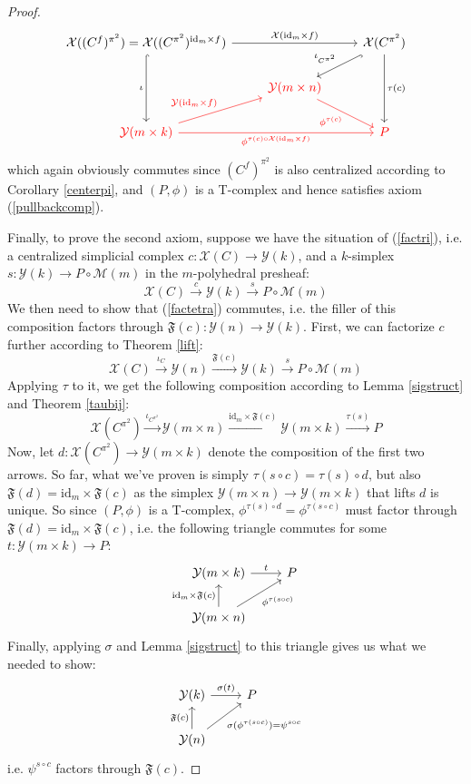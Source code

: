 \documentclass{article}
\theoremstyle{remark}
\theoremstyle{definition}
\newcommand{\id}{\mathrm{id}}
\newcommand{\Y}{\mathcal Y}
\newcommand{\X}{\mathcal X}
\newcommand{\F}{\mathfrak F}
\newcommand{\M}{\mathcal M}
\begin{document}
\begin{proof}
\[\begin{tikzcd}
			\X((C^f)^{\pi^2})=\X((C^{\pi^2})^{\id_m\times f})\arrow[hook]{dd}[swap]{\iota}\arrow{rr}{\X(\id_m\times f)}&&\X(C^{\pi^2})\arrow[hook]{ld}[swap]{\iota_{C^{\pi^2}}}\arrow{dd}{\tau(c)}\\
			&\color{red}{\Y(m\times n)}\arrow[color=red]{dr}[swap]{\phi^{\tau(c)}}\\
			\color{red}{\Y(m\times k)}\arrow[color=red]{ur}{\Y(\id_m\times f)}\arrow[color=red]{rr}[swap]{\phi^{\tau(c)\circ\X(\id_m\times f)}}&&\color{red}P
		\end{tikzcd}\]
		which again obviously commutes since $(C^f)^{\pi^2}$ is also centralized according to Corollary \ref{centerpi}, and $(P,\phi)$ is a T-complex and hence satisfies axiom (\ref{pullbackcomp}).
		
		Finally, to prove the second axiom, suppose we have the situation of (\ref{factri}), i.e. a centralized simplicial complex $c:\X(C)\to\Y(k)$, and a $k$-simplex $s:\Y(k)\to P\circ\M(m)$ in the $m$-polyhedral presheaf:
		\[\X(C)\xrightarrow{c}\Y(k)\xrightarrow{s}P\circ\M(m)\]
		We then need to show that (\ref{factetra}) commutes, i.e. the filler of this composition factors through $\F(c):\Y(n)\to\Y(k)$. First, we can factorize $c$ further according to Theorem \ref{lift}:
		\[\X(C)\xrightarrow{\iota_C}\Y(n)\xrightarrow{\F(c)}\Y(k)\xrightarrow{s}P\circ\M(m)\]
		Applying $\tau$ to it, we get the following composition according to Lemma \ref{sigstruct} and Theorem \ref{taubij}:
		\[\X(C^{\pi^2})\xrightarrow{\iota_{C^{\pi^2}}}\Y(m\times n)\xrightarrow{\id_m\times\F(c)}\Y(m\times k)\xrightarrow{\tau(s)}P\]
		Now, let $d:\X(C^{\pi^2})\to\Y(m\times k)$ denote the composition of the first two arrows. So far, what we've proven is simply $\tau(s\circ c)=\tau(s)\circ d$, but also $\F(d)=\id_m\times\F(c)$ as the simplex $\Y(m\times n)\to\Y(m\times k)$ that lifts $d$ is unique. So since $(P,\phi)$ is a T-complex, $\phi^{\tau(s)\circ d}=\phi^{\tau(s\circ c)}$ must factor through $\F(d)=\id_m\times\F(c)$, i.e. the following triangle commutes for some $t:\Y(m\times k)\to P$:
		\[\begin{tikzcd}
			\Y(m\times k)\arrow{r}{t}&P\\
			\Y(m\times n)\arrow{u}{\id_m\times\F(c)}\arrow{ur}[swap]{\phi^{\tau(s\circ c)}}
		\end{tikzcd}\]
		Finally, applying $\sigma$ and Lemma \ref{sigstruct} to this triangle gives us what we needed to show:
		\[\begin{tikzcd}
			\Y(k)\arrow{r}{\sigma(t)}&P\\
			\Y(n)\arrow{u}{\F(c)}\arrow{ur}[swap]{\sigma(\phi^{\tau(s\circ c)})=\psi^{s\circ c}}
		\end{tikzcd}\]
		i.e. $\psi^{s\circ c}$ factors through $\F(c)$.
	\end{proof}
\end{document}
